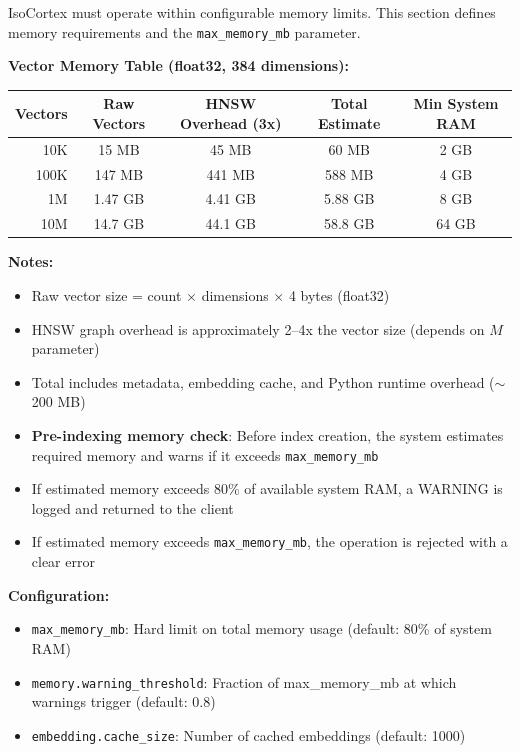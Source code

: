 \documentclass[11pt,a4paper]{article}
\newcommand{\inlinecode}[1]{\texttt{\small\colorbox{ctCodeBg}{#1}}}
\begin{document}
\begin{reqbox}
IsoCortex must operate within configurable memory limits. This section defines memory requirements and the \inlinecode{max\_memory\_mb} parameter.

\textbf{Vector Memory Table (float32, 384 dimensions):}
\begin{center}
\begin{tabular}{@{}rcccc@{}}
\toprule
\textbf{Vectors} & \textbf{Raw Vectors} & \textbf{HNSW Overhead (3x)} & \textbf{Total Estimate} & \textbf{Min System RAM} \\
\midrule
10K & 15 MB & 45 MB & 60 MB & 2 GB \\
100K & 147 MB & 441 MB & 588 MB & 4 GB \\
1M & 1.47 GB & 4.41 GB & 5.88 GB & 8 GB \\
10M & 14.7 GB & 44.1 GB & 58.8 GB & 64 GB \\
\bottomrule
\end{tabular}
\end{center}

\textbf{Notes:}
\begin{itemize}
    \item Raw vector size = count $\times$ dimensions $\times$ 4 bytes (float32)
    \item HNSW graph overhead is approximately 2--4x the vector size (depends on $M$ parameter)
    \item Total includes metadata, embedding cache, and Python runtime overhead ($\sim$200 MB)
    \item \textbf{Pre-indexing memory check}: Before index creation, the system estimates required memory and warns if it exceeds \inlinecode{max\_memory\_mb}
    \item If estimated memory exceeds 80\% of available system RAM, a WARNING is logged and returned to the client
    \item If estimated memory exceeds \inlinecode{max\_memory\_mb}, the operation is rejected with a clear error
\end{itemize}

\textbf{Configuration:}
\begin{itemize}
    \item \inlinecode{max\_memory\_mb}: Hard limit on total memory usage (default: 80\% of system RAM)
    \item \inlinecode{memory.warning\_threshold}: Fraction of max\_memory\_mb at which warnings trigger (default: 0.8)
    \item \inlinecode{embedding.cache\_size}: Number of cached embeddings (default: 1000)
\end{itemize}
\end{reqbox}
\end{document}
